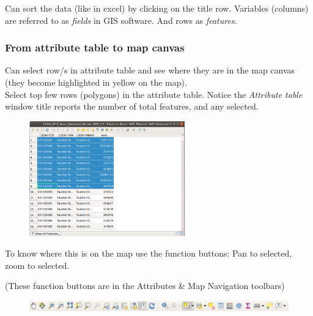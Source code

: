 Can sort the data (like in excel) by clicking on the title row. Variables (columns) are referred to as \textit{fields} in GIS software. And rows as \textit{features}.\\


\null\newpage

\subsubsection{From attribute table to map canvas}
Can select row/s in attribute table and see where they are in the map canvas (they become highlighted in yellow on the map).\\

Select top few rows (polygons) in the attribute table. Notice the \textit{Attribute table} window title reports the number of total features, and any selected.\\

\begin{figure}[!h]
	\centering
	\includegraphics[width=0.6\textwidth]{images/attribute_table_top_rows.png}
	\caption{}
	\label{ft_fig_firstfig3}
\end{figure}

To know where this is on the map use the function buttons: Pan to selected, zoom to selected.

(These function buttons are in the Attributes \& Map Navigation toolbars)

\begin{figure}[!h]
	\centering
	\includegraphics[width=1\textwidth]{images/attribute_and_map_navigation_toolbars_icons.png}
	\caption{}
	\label{ft_fig_firstfig3}
\end{figure}


